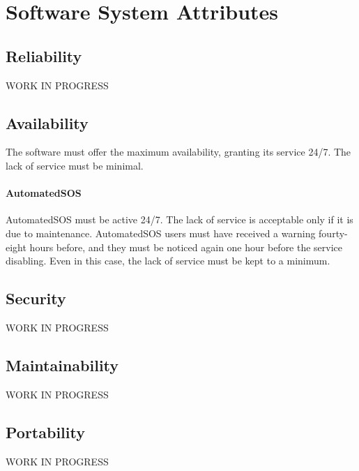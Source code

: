 \documentclass[../../rasd.tex]{subfiles}
\begin{document}
\section{Software System Attributes}
			\subsection{Reliability}
			WORK IN PROGRESS

			\subsection{Availability}
			The software must offer the maximum availability, granting its service 24/7. The lack of service must be minimal.
			\paragraph{AutomatedSOS}
			AutomatedSOS must be active 24/7. The lack of service is acceptable only if it is due to maintenance. AutomatedSOS users must have received a warning fourty-eight hours before, and they must be noticed again one hour before the service disabling.
			Even in this case, the lack of service must be kept to a minimum.

			\subsection{Security}
			WORK IN PROGRESS
			\subsection{Maintainability}
			WORK IN PROGRESS
			\subsection{Portability}
			WORK IN PROGRESS
\end{document}
